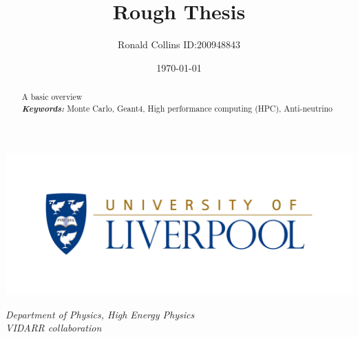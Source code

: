 \documentclass[12pt,a4paper]{article}
\title{Rough Thesis}
\date{\today}
\author{Ronald Collins ID:200948843}
\newenvironment{Figure}
  {\par\medskip\noindent\minipage{\linewidth}}
  {\endminipage\par\medskip}
\begin{document}
\maketitle

\begin{Figure}
 \centering
 \includegraphics[width=1.0\linewidth]{Liverpool_logo}
\end{Figure}


\begin{center}
\textit{Department of Physics, High Energy Physics\\}
\textit{VIDARR collaboration\\}
\end{center}


\newpage
{}
\begin{abstract}
\normalsize A basic overview\\

\providecommand{\keywords}[1]{\textbf{\textit{Keywords:}} #1} %
\keywords{Monte Carlo, Geant4, High performance computing (HPC), Anti-neutrino}
\end{abstract}
\vspace{5mm} %
\tableofcontents
\newpage

\end{document}
